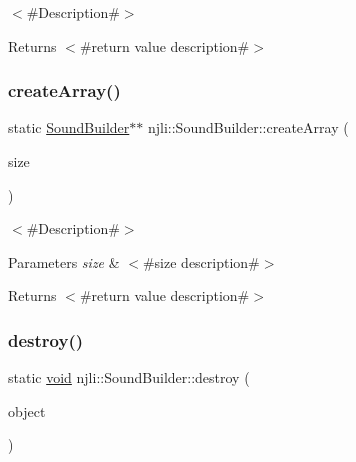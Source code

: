 $<$\#\+Description\#$>$

\begin{DoxyReturn}{Returns}
$<$\#return value description\#$>$ 
\end{DoxyReturn}
\mbox{\label{classnjli_1_1_sound_builder_aa467d7463364f288e2112b4dc49842c5}} 
\subsubsection{\texorpdfstring{create\+Array()}{createArray()}}
{\footnotesize\ttfamily static \mbox{\hyperlink{classnjli_1_1_sound_builder}{Sound\+Builder}}$\ast$$\ast$ njli\+::\+Sound\+Builder\+::create\+Array (\begin{DoxyParamCaption}\item[{const \mbox{\hyperlink{_util_8h_a10e94b422ef0c20dcdec20d31a1f5049}{u32}}}]{size }\end{DoxyParamCaption})\hspace{0.3cm}{\ttfamily [static]}}

$<$\#\+Description\#$>$


\begin{DoxyParams}{Parameters}
{\em size} & $<$\#size description\#$>$\\
\hline
\end{DoxyParams}
\begin{DoxyReturn}{Returns}
$<$\#return value description\#$>$ 
\end{DoxyReturn}
\mbox{\label{classnjli_1_1_sound_builder_abdaa0b9dc2013c0ea003a113c510667e}} 
\subsubsection{\texorpdfstring{destroy()}{destroy()}}
{\footnotesize\ttfamily static \mbox{\hyperlink{_thread_8h_af1e856da2e658414cb2456cb6f7ebc66}{void}} njli\+::\+Sound\+Builder\+::destroy (\begin{DoxyParamCaption}\item[{\mbox{\hyperlink{classnjli_1_1_sound_builder}{Sound\+Builder}} $\ast$}]{object }\end{DoxyParamCaption})\hspace{0.3cm}{\ttfamily [static]}}

